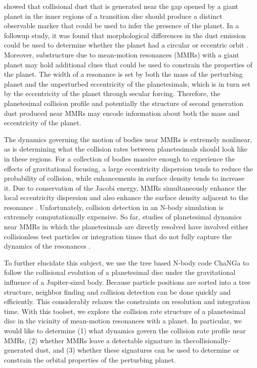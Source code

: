 \cite{dobinson13} showed that collisional dust that is generated near the gap opened by a giant planet in the inner regions of a 
transition disc should produce a distinct observable marker that could be used to infer the presence of the planet. In a followup 
study, it was found that morphological differences in the dust emission could be used to determine whether the planet had a 
circular or eccentric orbit \cite{dobinson16}. Moreover, substructure due to mean-motion resonances (MMRs) with a giant planet 
may hold additional clues that could be used to constrain the properties of the planet.  The width of a resonance is set by both 
the mass of the perturbing planet and the unperturbed eccentricity of the planetesimals, which is in turn set by the eccentricity of 
the planet through secular forcing. Therefore, the planetesimal collision profile and potentially the structure of second generation 
dust produced near MMRs may encode information about both the mass and eccentricity of the planet.

The dynamics governing the motion of bodies near MMRs is extremely nonlinear, as is determining what the collision rates 
between planetesimals should look like in these regions. For a collection of bodies massive enough to experience the effects of 
gravitational focusing, a large eccentricity dispersion tends to reduce the probability of collision, while enhancements in surface 
density tends to increase it. Due to conservation of the Jacobi energy, MMRs simultaneously enhance the local eccentricity 
dispersion and also enhance the surface density adjacent to the resonance \cite{richardson00, boley17}. Unfortunately, collision 
detection in an N-body simulation is extremely computationally expensive. So far, studies of planetesimal dynamics near MMRs 
in which the planetesimals are directly resolved have involved either collisionless test particles 
\cite{boley17, tabeshian16, tabeshian18} or integration times that do not fully capture the dynamics of the resonances 
\cite{richardson00, dobinson13}.

To further elucidate this subject, we use the tree based N-body code {\sc ChaNGa} \cite{jetley08, menon15} to follow the 
collisional evolution of a planetesimal disc under the gravitational influence of a Jupiter-sized body. Because particle positions 
are sorted into a tree structure, neighbor finding and collision detection can be done quickly and efficiently. This considerably 
relaxes the constraints on resolution and integration time. With this toolset, we explore the collision rate structure of a 
planetesimal disc in the vicinity of mean-motion resonances with a planet. In particular, we would like to determine (1) what 
dynamics govern the collision rate profile near MMRs, (2) whether MMRs leave a detectable signature in thecollisionally-
generated dust, and (3) whether these signatures can be used to determine or constrain the orbital properties of the perturbing 
planet.

